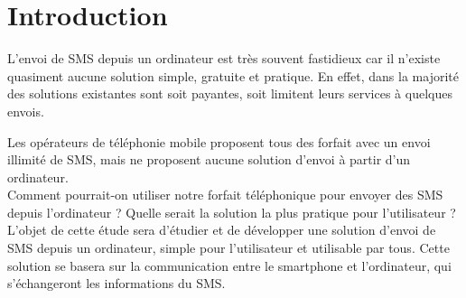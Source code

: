 \cleardoublepage



\chapter*{Introduction}


L'envoi de SMS depuis un ordinateur est très souvent fastidieux car il n'existe quasiment aucune solution simple, gratuite et pratique.
En effet, dans la majorité des solutions existantes sont soit payantes, soit limitent leurs services à quelques envois.

Les opérateurs de téléphonie mobile proposent tous des forfait avec un envoi illimité de SMS, mais ne proposent aucune solution d'envoi à partir d'un ordinateur.
\\




Comment pourrait-on utiliser notre forfait téléphonique pour envoyer des SMS depuis l'ordinateur ?
Quelle serait la solution la plus pratique pour l'utilisateur ?
\\




L'objet de cette étude sera d'étudier et de développer une solution d'envoi de SMS depuis un ordinateur, simple pour l'utilisateur et utilisable par tous.
Cette solution se basera sur la communication entre le smartphone et l'ordinateur, qui s'échangeront les informations du SMS.
\\



